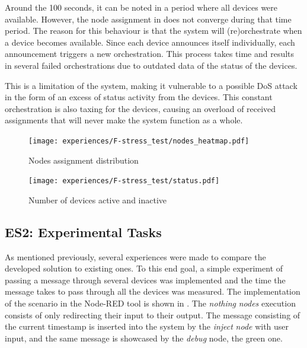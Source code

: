Around the 100 seconds, it can be noted in  a period where all devices were available. However, the node assignment in  does not converge during that time period. The reason for this behaviour is that the system will (re)orchestrate when a device becomes available. Since each device announces itself individually, each announcement triggers a new orchestration. This process takes time and results in several failed orchestrations due to outdated data of the status of the devices. 

This is a limitation of the system, making it vulnerable to a possible DoS attack in the form of an excess of status activity from the devices. This constant orchestration is also taxing for the devices, causing an overload of received assignments that will never make the system function as a whole.

\begin{figure}[h]
    \centering
    \texttt{[image: experiences/F-stress\_test/nodes\_heatmap.pdf]}
    \caption[Nodes assignment distribution]{Nodes assignment distribution}\label{fig:stress_test_nodes}
\end{figure}

\begin{figure}[h]
\centering
\texttt{[image: experiences/F-stress\_test/status.pdf]}
\caption[Number of devices active and inactive]{Number of devices active and inactive}\label{fig:stress_test_status}
\end{figure}


\subsection{ES2: Experimental Tasks}\label{sec:discussion_scenario2}

As mentioned previously, several experiences were made to compare the developed solution to existing ones. To this end goal, a simple experiment of passing a message through several devices was implemented and the time the message takes to pass through all the devices was measured. The implementation of the scenario in the Node-RED tool is shown in . The \textit{nothing} \textit{nodes} execution consists of only redirecting their input to their output. The message consisting of the current timestamp is inserted into the system by the \textit{inject} \textit{node} with user input, and the same message is showcased by the \textit{debug} node, the green one.

